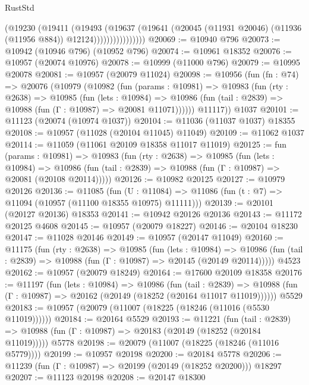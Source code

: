 \begin{lexlean}{RustStd}
\begin{coremodule}
                        (@19230
                          (@19411
                            (@19493
                              (@19637
                                (@19641
                                  (@20045
                                    (@11931 @20046)
                                    (@11936 (@11956 @884))
                                    @12124))))))))))))))))
@20069 := @10940 @796
@20073 := @10942 (@10946 @796) (@10952 @796)
@20074 := @10961 @18352
@20076 := @10957 (@20074 @10976)
@20078 := @10999 (@11000 @796)
@20079 := @10995 @20078
@20081 := @10957 (@20079 @11024)
@20098 := @10956
    (fun (fn : @74) =>
    @20076
      (@10979
        (@10982
          (fun (params : @10981) =>
          @10983
            (fun (rty : @2638) =>
            @10985
              (fun (lets : @10984) =>
              @10986 (fun (tail : @2839) => @10988 (fun (Γ : @10987) => @20081 @11071))))))
        @11117))
    @1037
@20101 := @11123 (@20074 (@10974 @1037))
@20104 := @11036 (@11037 @1037) @18355
@20108 := @10957 (@11028 (@20104 @11045) @11049)
@20109 := @11062 @1037
@20114 := @11059 (@11061 @20109 @18358 @11017 @11019)
@20125 := fun (params : @10981) =>
  @10983
    (fun (rty : @2638) =>
    @10985
      (fun (lets : @10984) =>
      @10986 (fun (tail : @2839) => @10988 (fun (Γ : @10987) => @20081 (@20108 @20114)))))
@20126 := @10982 @20125
@20127 := @10979 @20126
@20136 := @11085
    (fun (U : @11084) => @11086 (fun (t : @7) => @11094 (@10957 (@11100 @18355 @10975) @11111)))
@20139 := @20101 (@20127 @20136) @18353
@20141 := @10942 @20126 @20136
@20143 := @11172 @20125 @4608
@20145 := @10957 (@20079 @18227)
@20146 := @20104 @18230
@20147 := @11028 @20146
@20149 := @10957 (@20147 @11049)
@20160 := @11175
    (fun (rty : @2638) =>
    @10985
      (fun (lets : @10984) =>
      @10986 (fun (tail : @2839) => @10988 (fun (Γ : @10987) => @20145 (@20149 @20114)))))
    @4523
@20162 := @10957 (@20079 @18249)
@20164 := @17600 @20109 @18358
@20176 := @11197
    (fun (lets : @10984) =>
    @10986
      (fun (tail : @2839) =>
      @10988 (fun (Γ : @10987) => @20162 (@20149 (@18252 (@20164 @11017 @11019))))))
    @5529
@20183 := @10957 (@20079 (@11007 (@18225 (@18246 (@11016 (@5530 @11019))))))
@20184 := @20164 @5529
@20193 := @11221
    (fun (tail : @2839) => @10988 (fun (Γ : @10987) => @20183 (@20149 (@18252 (@20184 @11019)))))
    @5778
@20198 := @20079 (@11007 (@18225 (@18246 (@11016 @5779))))
@20199 := @10957 @20198
@20200 := @20184 @5778
@20206 := @11239 (fun (Γ : @10987) => @20199 (@20149 (@18252 @20200))) @18297
@20207 := @11123 @20198
@20208 := @20147 @18300

\end{coremodule}
\end{lexlean}
